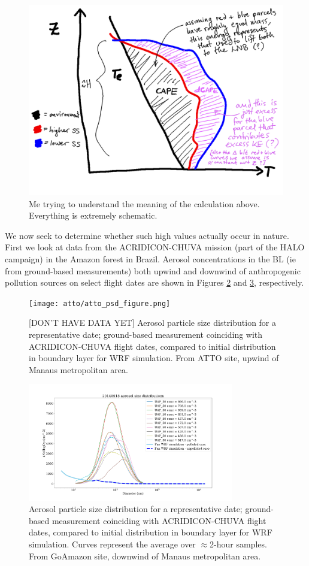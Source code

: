 \documentclass{article}
\begin{document}
\begin{figure}[ht]
    \centering
    \includegraphics[width=12cm]{capesketch.png}
    \caption{Me trying to understand the meaning of the calculation above. Everything is extremely schematic.}
    \label{capesketch}
\end{figure}

We now seek to determine whether such high values actually occur in nature. First we look at data from the ACRIDICON-CHUVA mission (part of the HALO campaign) in the Amazon forest in Brazil. Aerosol concentrations in the BL (ie from ground-based measurements) both upwind and downwind of anthropogenic pollution sources on select flight dates are shown in Figures \ref{attoasd} and \ref{goaasd}, respectively.

\clearpage
\newpage

\begin{figure}[ht]
    \centering
    \texttt{[image: atto/atto\_psd\_figure.png]}
    \caption{[DON'T HAVE DATA YET] Aerosol particle size distribution for a representative date; ground-based measurement coinciding with ACRIDICON-CHUVA flight dates, compared to initial distribution in boundary layer for WRF simulation. From ATTO site, upwind of Manaus metropolitan area.}
    \label{attoasd}
\end{figure}
\begin{figure}[ht]
    \centering
    \includegraphics[width=9cm]{goama/v5_aero_size_distb_20140918_figure.png}
    \caption{Aerosol particle size distribution for a representative date; ground-based measurement coinciding with ACRIDICON-CHUVA flight dates, compared to initial distribution in boundary layer for WRF simulation. Curves represent the average over $\approx$2-hour samples. From GoAmazon site, downwind of Manaus metropolitan area.}
    \label{goaasd}
\end{figure}
\end{document}
